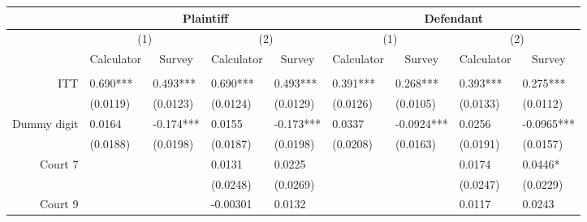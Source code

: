 \begin{tabular}{rrrrrrrrr}
\toprule
      & \multicolumn{4}{c}{Plaintiff} & \multicolumn{4}{c}{Defendant} \\
\midrule
      & \multicolumn{2}{c}{(1)} & \multicolumn{2}{c}{(2)} & \multicolumn{2}{c}{(1)} & \multicolumn{2}{c}{(2)} \\
      & \multicolumn{1}{c}{Calculator} & \multicolumn{1}{c}{Survey} & \multicolumn{1}{c}{Calculator} & \multicolumn{1}{c}{Survey} & \multicolumn{1}{c}{Calculator} & \multicolumn{1}{c}{Survey} & \multicolumn{1}{c}{Calculator} & \multicolumn{1}{c}{Survey} \\
      &       &       &       &       &       &       &       &  \\
ITT   & \multicolumn{1}{l}{0.690***} & \multicolumn{1}{l}{0.493***} & \multicolumn{1}{l}{0.690***} & \multicolumn{1}{l}{0.493***} & \multicolumn{1}{l}{0.391***} & \multicolumn{1}{l}{0.268***} & \multicolumn{1}{l}{0.393***} & \multicolumn{1}{l}{0.275***} \\
      & \multicolumn{1}{l}{(0.0119)} & \multicolumn{1}{l}{(0.0123)} & \multicolumn{1}{l}{(0.0124)} & \multicolumn{1}{l}{(0.0129)} & \multicolumn{1}{l}{(0.0126)} & \multicolumn{1}{l}{(0.0105)} & \multicolumn{1}{l}{(0.0133)} & \multicolumn{1}{l}{(0.0112)} \\
Dummy digit & \multicolumn{1}{l}{0.0164} & \multicolumn{1}{l}{-0.174***} & \multicolumn{1}{l}{0.0155} & \multicolumn{1}{l}{-0.173***} & \multicolumn{1}{l}{0.0337} & \multicolumn{1}{l}{-0.0924***} & \multicolumn{1}{l}{0.0256} & \multicolumn{1}{l}{-0.0965***} \\
      & \multicolumn{1}{l}{(0.0188)} & \multicolumn{1}{l}{(0.0198)} & \multicolumn{1}{l}{(0.0187)} & \multicolumn{1}{l}{(0.0198)} & \multicolumn{1}{l}{(0.0208)} & \multicolumn{1}{l}{(0.0163)} & \multicolumn{1}{l}{(0.0191)} & \multicolumn{1}{l}{(0.0157)} \\
Court 7 & \multicolumn{1}{l}{} & \multicolumn{1}{l}{} & \multicolumn{1}{l}{0.0131} & \multicolumn{1}{l}{0.0225} & \multicolumn{1}{l}{} & \multicolumn{1}{l}{} & \multicolumn{1}{l}{0.0174} & \multicolumn{1}{l}{0.0446*} \\
      & \multicolumn{1}{l}{} & \multicolumn{1}{l}{} & \multicolumn{1}{l}{(0.0248)} & \multicolumn{1}{l}{(0.0269)} & \multicolumn{1}{l}{} & \multicolumn{1}{l}{} & \multicolumn{1}{l}{(0.0247)} & \multicolumn{1}{l}{(0.0229)} \\
Court 9 & \multicolumn{1}{l}{} & \multicolumn{1}{l}{} & \multicolumn{1}{l}{-0.00301} & \multicolumn{1}{l}{0.0132} & \multicolumn{1}{l}{} & \multicolumn{1}{l}{} & \multicolumn{1}{l}{0.0117} & \multicolumn{1}{l}{0.0243} \\

\end{tabular}
